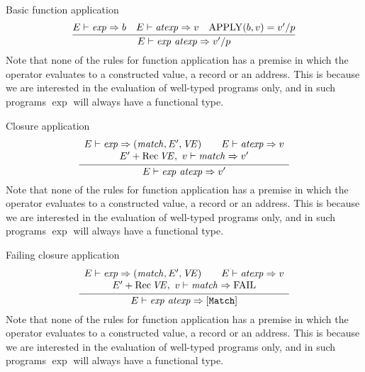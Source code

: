 \begin{inference-rule}{Basic function application}
\begin{equation}\label{rule:dynamic-core:}
  \vcenter{\infer{\E\ts\appexp\ra\V'/\p}
    {\E\ts\exp\ra b
      & \E\ts\atexp\ra\V
      & \APPLY(b,\V)=\V'/\p}}
\end{equation}
Note that none of the rules for function application has a premise
in which the operator evaluates to a constructed value, a record or an
address. This is because we are interested in the evaluation of
well-typed programs only, and in such programs $\exp$ will always have a
functional type.
\end{inference-rule}

\begin{inference-rule}{Closure application}
\begin{equation}\label{rule:dynamic-core:closapp}
\vcenter{\infer{\E\ts\appexp\ra\V'}
  {\begin{array}{c}
      \E\ts\exp\ra(\match,\E',\VE)\qquad\E\ts\atexp\ra\V\\
      \E'+\Rec\VE,\ \V\ts\match\ra\V'
      \end{array}}}
\end{equation}
Note that none of the rules for function application has a premise
in which the operator evaluates to a constructed value, a record or an
address. This is because we are interested in the evaluation of
well-typed programs only, and in such programs $\exp$ will always have a
functional type.
\end{inference-rule}

\begin{inference-rule}{Failing closure application}
\begin{equation}\label{rule:dynamic-core:closapp1}
\vcenter{\infer{\E\ts\appexp\ra[{\tt Match}]}
  {\begin{array}{c}
      \E\ts\exp\ra(\match,\E',\VE)\qquad\E\ts\atexp\ra\V\\
      \E'+\Rec\VE,\ \V\ts\match\ra\FAIL
   \end{array}}}
\end{equation}
Note that none of the rules for function application has a premise
in which the operator evaluates to a constructed value, a record or an
address. This is because we are interested in the evaluation of
well-typed programs only, and in such programs $\exp$ will always have a
functional type.
\end{inference-rule}

